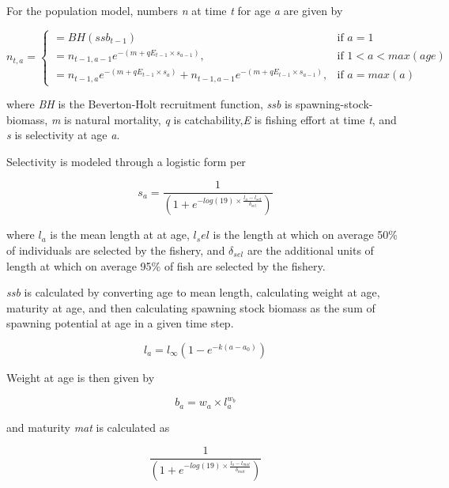 \documentclass[]{article}
\begin{document}
For the population model, numbers \emph{n} at time \emph{t} for age \emph{a} are given by

\begin{equation}
n_{t,a}=\begin{cases}
      = BH(ssb_{t-1}) & \text{if $a = 1$}\\
     = n_{t-1,a-1}e^{-(m + qE_{t-1}{\times}s_{a-1})}, & \text{if $1< a < max(age)$}\\
     =  n_{t-1,a}e^{-(m + qE_{t-1}{\times}s_a)} + n_{t-1,a-1}e^{-(m + qE_{t-1}{\times}s_{a-1})}, & \text{if $a = max(a)$}
  \end{cases}
  \label{eq:pop}
\end{equation}

where \emph{BH} is the Beverton-Holt recruitment function, \emph{ssb} is spawning-stock-biomass, \emph{m} is natural mortality, \emph{q} is catchability,\emph{E} is fishing effort at time \emph{t}, and \emph{s} is selectivity at age \emph{a}.

Selectivity is modeled through a logistic form per

\begin{equation}
s_a=\frac{1}{(1 + e^{-log(19)\times\frac{l_a - l_{sel}}{\delta_{sel}}})}
  \label{eq:sel}
\end{equation}

where \(l_a\) is the mean length at at age, \(l_sel\) is the length at which on average 50\% of individuals are selected by the fishery, and \(\delta_{sel}\) are the additional units of length at which on average 95\% of fish are selected by the fishery.

\emph{ssb} is calculated by converting age to mean length, calculating weight at age, maturity at age, and then calculating spawning stock biomass as the sum of spawning potential at age in a given time step.

\begin{equation}
  l_{a} = l_{\infty}\left(1 - e^{-k(a - a_0)}\right)
  \label{eq:len}
\end{equation}

Weight at age is then given by

\begin{equation}
  b_{a} = w_a \times l_{a}^{w_b}
  \label{eq:weight}
\end{equation}

and maturity \emph{mat} is calculated as

\begin{equation}
  \frac{1}{(1 + e^{-log(19)\times\frac{l_a - l_{mat}}{\delta_{mat}}})}
  \label{eq:mat}
\end{equation}
\end{document}
